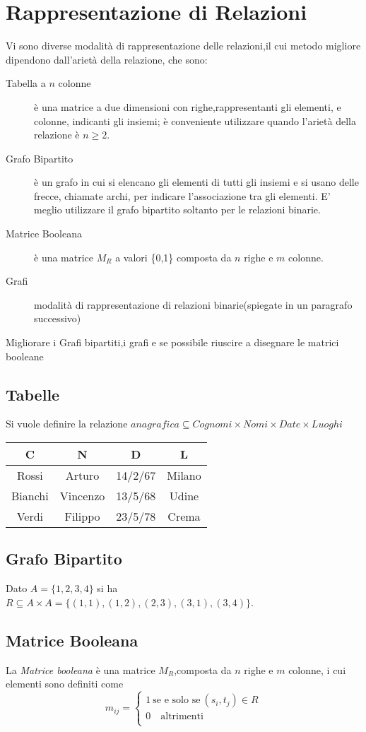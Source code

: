 \section{Rappresentazione di Relazioni}
Vi sono diverse modalità di rappresentazione delle relazioni,il cui metodo migliore
dipendono dall'arietà della relazione, che sono:
\begin{description}
    \item[Tabella a $n$ colonne] è una matrice a due dimensioni con righe,rappresentanti
          gli elementi, e colonne, indicanti gli insiemi; è conveniente utilizzare
          quando l'arietà della relazione è $n \geq 2$.
    \item[Grafo Bipartito] è un grafo in cui si elencano gli elementi di tutti gli insiemi
         e si usano delle frecce, chiamate archi, per indicare l'associazione tra gli elementi.
         E' meglio utilizzare il grafo bipartito soltanto per le relazioni binarie.
    \item[Matrice Booleana] è una matrice $M_R$ a valori \{0,1\} composta da $n$ righe e $m$ colonne.
    \item[Grafi] modalità di rappresentazione di relazioni binarie(spiegate in un paragrafo successivo)
\end{description}
Migliorare i Grafi bipartiti,i grafi e se possibile riuscire a disegnare le matrici booleane
\subsection{Tabelle}
Si vuole definire la relazione $anagrafica \subseteq Cognomi \times Nomi \times Date \times Luoghi$

\begin{tabular}{cccc}
\toprule
C & N & D & L \\
\midrule
Rossi & Arturo & 14/2/67 & Milano \\
Bianchi & Vincenzo & 13/5/68 & Udine \\
Verdi & Filippo & 23/5/78 & Crema \\
\bottomrule
\end{tabular}

\subsection{Grafo Bipartito}
Dato  $A = \{ 1,2,3,4 \}$ si ha $R \subseteq A \times A = \{ (1,1),(1,2),(2,3),(3,1),(3,4) \}$.


\subsection{Matrice Booleana}
La \emph{Matrice booleana} è una matrice $M_R$,composta da $n$ righe e $m$ colonne,
i cui elementi sono definiti come
\begin{equation*}
    m_{ij} = \begin{cases} 1 \ \text{se e solo se} \ (s_i,t_j) \in R \\
                           0 \quad \text{altrimenti} \\
             \end{cases}
\end{equation*}


